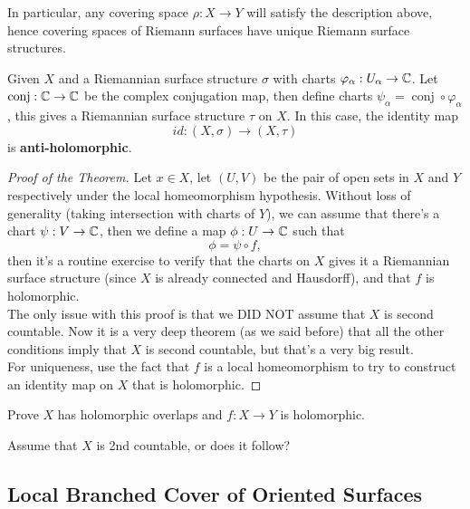 \documentclass{article}
\begin{document}
\begin{remark}
    In particular, any covering space $\rho: X \to Y$ will satisfy the description above, hence covering spaces of Riemann surfaces have unique Riemann surface structures.
\end{remark}

\begin{remark}
    Given $X$ and a Riemannian surface structure $\sigma$ with charts $\varphi_\alpha: U_\alpha \to \mathbb{C}$. Let $\operatorname{conj}: \mathbb{C} \to \mathbb{C}$ be the complex conjugation map, then define charts $\psi_\alpha = \operatorname{conj} \circ \varphi_\alpha$, this gives a Riemannian surface structure $\tau$ on $X$. In this case, the identity map
    \[id: (X, \sigma) \to (X, \tau)\]
    is \textbf{anti-holomorphic}.
\end{remark}

\begin{proof}[Proof of the Theorem]
    Let $x \in X$, let $(U, V)$ be the pair of open sets in $X$ and $Y$ respectively under the local homeomorphism hypothesis. Without loss of generality (taking intersection with charts of $Y$), we can assume that there's a chart $\psi: V \to \mathbb{C}$, then we define a map $\phi: U \to \mathbb{C}$ such that
    \[\phi = \psi \circ f,\]
    then it's a routine exercise to verify that the charts on $X$ gives it a Riemannian surface structure (since $X$ is already connected and Hausdorff), and that $f$ is holomorphic.\\
    
    The only issue with this proof is that we DID NOT assume that $X$ is second countable. Now it is a very deep theorem (as we said before) that all the other conditions imply that $X$ is second countable, but that's a very big result.\\

    For uniqueness, use the fact that $f$ is a local homeomorphism to try to construct an identity map on $X$ that is holomorphic.
\end{proof}

\begin{exercise}
    Prove $X$ has holomorphic overlaps and $f: X \to Y$ is holomorphic.
\end{exercise}

\begin{exercise}
    Assume that $X$ is 2nd countable, or does it follow?
\end{exercise}

\subsection{Local Branched Cover of Oriented Surfaces}
\end{document}
